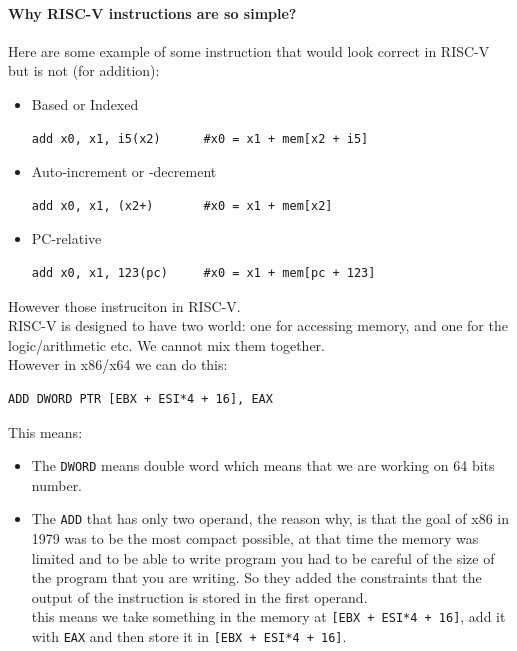 \paragraph{Why RISC-V instructions are so simple?}%
\label{par:Why RISC-V instructions are so simple?}

\begin{framedremark}
Here are some example of some instruction that would look correct in RISC-V but is not (for addition):
\begin{itemize}
    \item Based or Indexed
		\begin{lstlisting}[language={[RISC-V]Assembler}]
	add x0, x1, i5(x2)		#x0 = x1 + mem[x2 + i5]
		\end{lstlisting}
	\item Auto-increment or -decrement
		\begin{lstlisting}[language={[RISC-V]Assembler}]
	add x0, x1, (x2+) 		#x0 = x1 + mem[x2]
		\end{lstlisting}
	\item PC-relative
		\begin{lstlisting}[language={[RISC-V]Assembler}]
	add x0, x1, 123(pc)		#x0 = x1 + mem[pc + 123]
		\end{lstlisting}
\end{itemize}
However those instruciton  in RISC-V.\\
RISC-V is designed to have  two world: one for accessing memory, and one for the logic/arithmetic etc. We cannot mix them together.\\
However in x86/x64 we can do this:
\begin{lstlisting}[language={[x64]Assembler}]
	ADD DWORD PTR [EBX + ESI*4 + 16], EAX
\end{lstlisting}
This means:
\begin{itemize}
    \item The \texttt{DWORD} means double word which means that we are working on 64 bits number.
	\item The \texttt{ADD} that has only two operand, the reason why, is that the goal of x86 in 1979 was to be the most compact possible, at that time the memory was limited and to be able to write program you had to be careful of the size of the program that you are writing. So they added the constraints that the output of the instruction is stored in the first operand. \\ this means we take something in the memory at \texttt{[EBX + ESI*4 + 16]}, add it with \texttt{EAX} and then store it in \texttt{[EBX + ESI*4 + 16]}. 

\end{itemize}
\end{framedremark}
